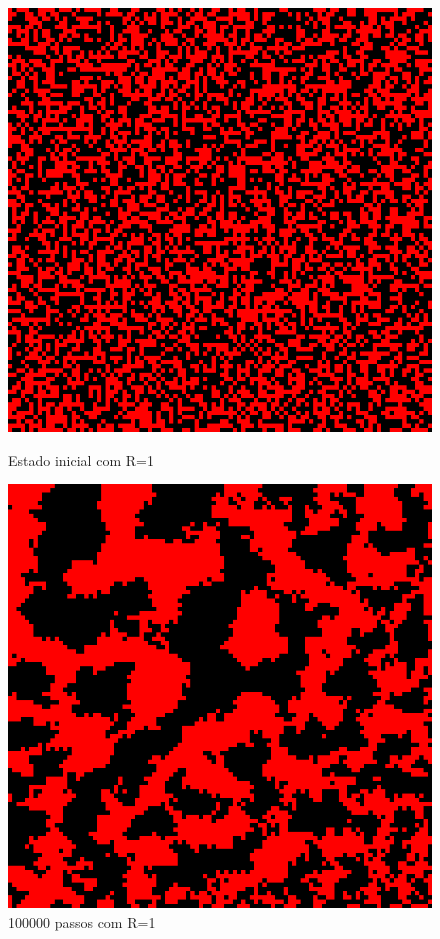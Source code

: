\documentclass[conference]{IEEEtran}
\begin{document}
\begin{figure}[H] 
  \begin{minipage}[b]{0.5\linewidth}
    \label{fig:r1} 
    \centering
    \includegraphics[width=.8\linewidth]{resultados/1-0.png} 
    \caption{Estado inicial com R=1} 
    \vspace{4ex}
  \end{minipage}%
  \begin{minipage}[b]{0.5\linewidth}
    \centering
    \includegraphics[width=.8\linewidth]{resultados/1-1.png} 
    \caption{100000 passos com R=1} 
    \vspace{4ex}

\end{minipage}
\end{figure}
\end{document}

